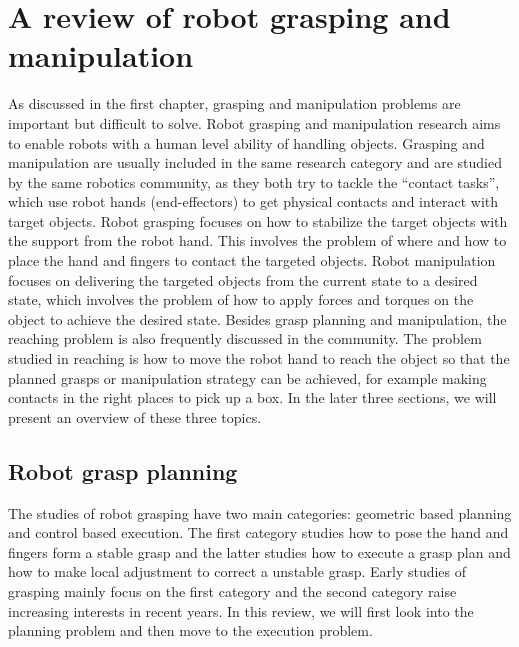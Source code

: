 \section{A review of robot grasping and manipulation}
\label{cha2:sec1}
As discussed in the first chapter, grasping and manipulation problems are important but difficult to solve.
Robot grasping and manipulation research aims to enable robots with a human level ability of handling objects. Grasping and manipulation are usually included in the same research category and are studied by the same robotics community, as they both try to tackle the ``contact tasks'', which  use robot hands (end-effectors) to get physical contacts and interact with target objects.
Robot grasping focuses on how to stabilize the target objects with the support from the robot hand. This involves the problem of where and how to place the hand and fingers to contact the targeted objects. Robot manipulation focuses on delivering the targeted objects from the current state to a desired state, which involves the problem of how to apply forces and torques on the object to achieve the desired state. Besides grasp planning and manipulation, the reaching problem is also frequently discussed in the community.
The problem studied in reaching is how to move the robot hand to reach the object so that the planned grasps or manipulation strategy can be achieved, for example making contacts in the right places to pick up a box. In the later three sections, we will present an overview of these three topics.

\subsection{Robot grasp planning}
\label{cha2:sec1:planning}

The studies of robot grasping have two main categories: geometric based planning and control based execution. The first category studies how to pose the hand and fingers form a stable grasp and the latter studies how to execute a grasp plan and how to make local adjustment to correct a unstable grasp. Early studies of grasping mainly focus on the first category and the second category raise increasing interests in recent years. In this review, we will first look into the planning problem and then move to the execution problem.

